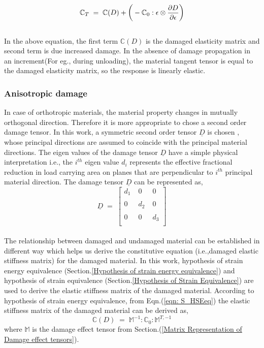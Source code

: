 \documentclass[a4paper,14pt]{extarticle}
\begin{document}
\begin{equation}
\large{\mathbb{C}_{T}  \; = \; \mathbb{C}(D) + \Big(-\mathbb{C}_{0} : \epsilon \otimes \frac{\partial D}{\partial \epsilon }\Big)    }
\end{equation}
\\
In the above equation, the first term $\mathbb{C}(D)$ is the damaged elasticity matrix and second term is due increased damage. In the absence of damage propagation in an increment(For eg., during unloading), the material tangent tensor is equal to the damaged elasticity matrix, so the response is linearly elastic.
\subsubsection{Anisotropic damage}
\indent\indent\indent In case of orthotropic materials, the material property changes in mutually orthogonal direction. Therefore it is more appropriate to chose a second order damage tensor. In this work, a symmetric second order tensor $\underline{D}$ is chosen , whose principal directions are assumed to coincide with the principal material directions. The eigen values of the damage tensor $\underline{D}$ have a simple physical interpretation i.e., the $i^{th}$ eigen value $d_{i}$ represents the effective fractional reduction in load carrying area on planes that are perpendicular to $i^{th}$ principal material direction. The damage tensor $\underline{D}$ can be represented as,\\
$$
\underline{D} \; = \; 
 \begin{bmatrix}
  d_{1}  \;& 0  \; & 0  \\
  \\
  0 \; & d_{2} \; & 0  \\
  \\  
  0 \; & 0 \; & d_{3} \\
  
 \end{bmatrix}
 $$  
\\
The relationship between damaged and undamaged material can be established in different way which helps us derive the constitutive equation (i.e.,damaged elastic stiffness matrix) for the damaged material. In this work, hypothesis of strain energy equivalence (Section.\ref{Hypothesis of strain energy equivalence}) and hypothesis of strain equivalence (Section.\ref{Hypothesis of Strain Equivalence}) are used to derive the elastic stiffness matrix of the damaged material. According to hypothesis of strain energy equivalence, from Eqn.(\ref{eqn: S_HSEeq}) the elastic stiffness matrix of the damaged material can be derived as,\\
\begin{equation}
\mathbb{C}(D) \; = \; \mathbb{M}^{-1} : \mathbb{C}_{0} :  \mathbb{M}^{T,-1}  
\label{Damaged_elasticity_matrix_1}
\end{equation}
where $\mathbb{M}$ is the damage effect tensor from Section.(\ref{Matrix Representation of Damage effect tensors}). 
\end{document}
